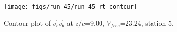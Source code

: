 \begin{figure}[H]
\centering
\texttt{[image: figs/run\_45/run\_45\_rt\_contour]}
\caption{Contour plot of $\overline{v_{r}^{\prime} v_{\theta}^{\prime}}$ at $z/c$=9.00, $V_{free}$=23.24, station 5.}
\label{fig:run_45_rt_contour}
\end{figure}


